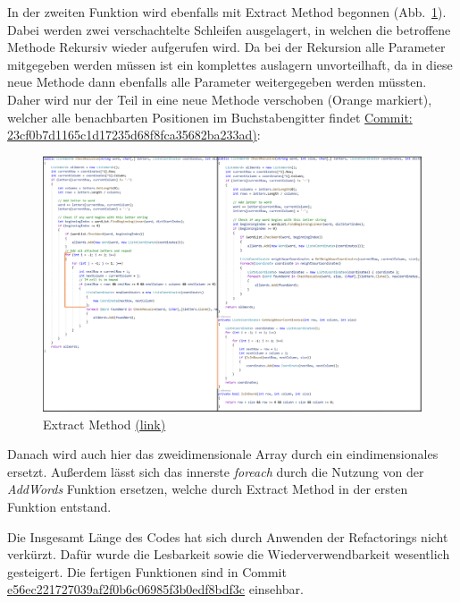 In der zweiten Funktion wird ebenfalls mit Extract Method begonnen (Abb.~\ref{Abb:ExtractMethod2}). Dabei werden zwei verschachtelte Schleifen ausgelagert, in welchen die betroffene Methode Rekursiv wieder aufgerufen wird. Da bei der Rekursion alle Parameter mitgegeben werden müssen ist ein komplettes auslagern unvorteilhaft, da in diese neue Methode dann ebenfalls alle Parameter weitergegeben werden müssten. Daher wird nur der Teil in eine neue Methode verschoben (Orange markiert), welcher alle benachbarten Positionen im Buchstabengitter findet \href{https://github.com/EinToni/Wortfinder/commit/23cf0b7d1165c1d17235d68f8fca35682ba233ad}{Commit: 23cf0b7d1165c1d17235d68f8fca35682ba233ad)}:
\newpage
\begin{figure}[!ht]
  \centering
  \includegraphics[width=\textwidth]{Bilder/ExtractMethod2.PNG}
  \caption[Extract Method]{Extract Method \href{https://github.com/EinToni/WortfinderDoku/blob/main/Bilder/ExtractMethod2.png}{(link)}}
  \label{Abb:ExtractMethod2}
\end{figure}

Danach wird auch hier das zweidimensionale Array durch ein eindimensionales ersetzt. Außerdem lässt sich das innerste \textit{foreach} durch die Nutzung von der \textit{AddWords} Funktion ersetzen, welche durch Extract Method in der ersten Funktion entstand. 


Die Insgesamt Länge des Codes hat sich durch Anwenden der Refactorings nicht verkürzt. Dafür wurde die Lesbarkeit sowie die Wiederverwendbarkeit wesentlich gesteigert. Die fertigen Funktionen sind in Commit \href{https://github.com/EinToni/Wortfinder/commit/e56ec221727039af2f0b6c06985f3b0edf8bdf3c}{e56ec221727039af2f0b6c06985f3b0edf8bdf3c} einsehbar.

